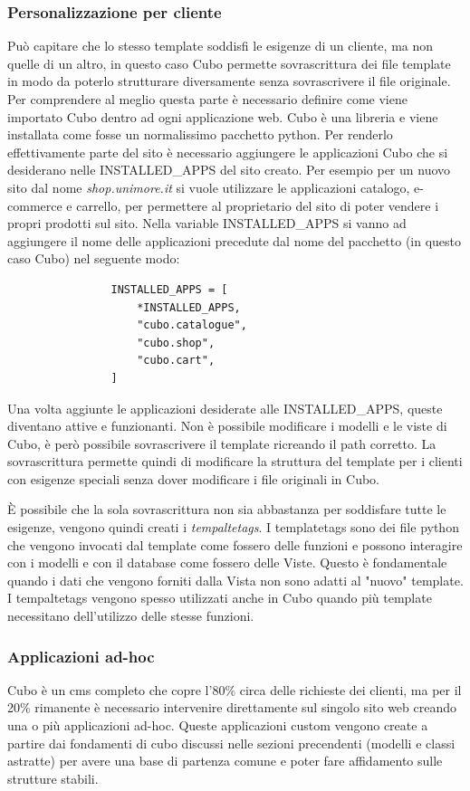 \documentclass[12pt,a4paper]{article}
\begin{document}
\subsubsection{Personalizzazione per cliente}
Può capitare che lo stesso template soddisfi le esigenze di un cliente, ma non quelle di un altro, in questo caso Cubo permette sovrascrittura dei file template in modo da poterlo strutturare diversamente senza sovrascrivere il file originale. Per comprendere al meglio questa parte è necessario definire come viene importato Cubo dentro ad ogni applicazione web.
Cubo è una libreria e viene installata come fosse un normalissimo pacchetto python. Per renderlo effettivamente parte del sito è necessario aggiungere le applicazioni Cubo che si desiderano nelle INSTALLED\_APPS del sito creato. Per esempio per un nuovo sito dal nome \textit{shop.unimore.it} si vuole utilizzare le applicazioni catalogo, e-commerce e carrello, per permettere al proprietario del sito di poter vendere i propri prodotti sul sito. Nella variable INSTALLED\_APPS si vanno ad aggiungere il nome delle applicazioni precedute dal nome del pacchetto (in questo caso Cubo) nel seguente modo:
\begin{Verbatim}
                INSTALLED_APPS = [
                    *INSTALLED_APPS,
                    "cubo.catalogue",
                    "cubo.shop",
                    "cubo.cart",
                ]
\end{Verbatim}
Una volta aggiunte le applicazioni desiderate alle INSTALLED\_APPS, queste diventano attive e funzionanti. Non è possibile modificare i modelli e le viste di Cubo, è però possibile sovrascrivere il template ricreando il path corretto. La sovrascrittura permette quindi di modificare la struttura del template per i clienti con esigenze speciali senza dover modificare i file originali in Cubo.

È possibile che la sola sovrascrittura non sia abbastanza per soddisfare tutte le esigenze, vengono quindi creati i \textit{tempaltetags}. I templatetags sono dei file python che vengono invocati dal template come fossero delle funzioni e possono interagire con i modelli e con il database come fossero delle Viste. Questo è fondamentale quando i dati che vengono forniti dalla Vista non sono adatti al "nuovo" template.
I tempaltetags vengono spesso utilizzati anche in Cubo quando più template necessitano dell'utilizzo delle stesse funzioni.

\subsubsection{Applicazioni ad-hoc}
Cubo è un cms completo che copre l'80\% circa delle richieste dei clienti, ma per il 20\% rimanente è necessario intervenire direttamente sul singolo sito web creando una o più applicazioni ad-hoc. Queste applicazioni custom vengono create a partire dai fondamenti di cubo discussi nelle sezioni precendenti (modelli e classi astratte) per avere una base di partenza comune e poter fare affidamento sulle strutture stabili.
\end{document}
